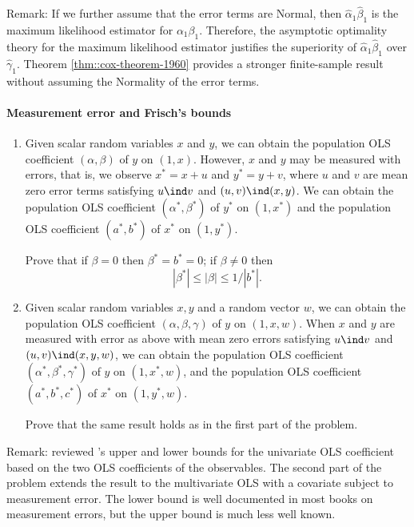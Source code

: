  

Remark: If we further assume that the error terms are Normal, then $\hat\alpha_1 \hat\beta_1$ is the maximum likelihood estimator for $\alpha_1 \beta_1$. Therefore, the asymptotic optimality theory for the maximum likelihood estimator justifies the superiority of $\hat\alpha_1 \hat\beta_1$ over $\hat\gamma_1$. Theorem \ref{thm::cox-theorem-1960} provides a stronger finite-sample result without assuming the Normality of the error terms. 



\paragraph{Measurement error and Frisch's bounds}\label{hw11::measurement-error}



\begin{enumerate}
\item
Given scalar random variables $x$ and $y$, we can obtain the population OLS coefficient $(\alpha, \beta)$ of $y$ on $(1,x)$. However, $x$ and $y$ may be measured with errors, that is, we observe $x^* = x + u$ and $y^* = y + v$, where $u$ and $v$ are mean zero error terms satisfying $u\ind v$  and $(u ,v )\ind (x,y)$. We can obtain the population OLS coefficient $(\alpha^*, \beta^*)$ of $y^*$ on $(1,x^*)$ and the population OLS coefficient $(a^*, b^*)$ of $x^*$ on $(1,y^*)$. 

 Prove that if $\beta = 0$ then $ \beta^*  =b^* = 0 $; if $\beta \neq  0$ then
$$ 
| \beta^* | \leq |\beta | \leq 
1 / |  b^* |   .
$$





\item
Given scalar random variables $x, y$ and a random vector $w$, we can obtain the population OLS coefficient $(\alpha, \beta, \gamma)$ of $y$ on $(1,x,w)$. When $x$ and $y$ are measured with error as above with mean zero errors satisfying $u\ind v$ and  $(u ,v )\ind (x,y,w)$, we can obtain the population OLS coefficient $(\alpha^*, \beta^*, \gamma^*)$ of $y$ on $(1,x^*,w)$, and the population OLS coefficient $(a^*, b^*, c^*)$ of $x^*$ on $(1,y^*,w)$.

Prove that the same result holds as in the first part of the problem. 
\end{enumerate}




Remark: \citet{tamer2010partial} reviewed \citet{frisch1934statistical}'s upper and lower bounds for the univariate OLS coefficient based on the two OLS coefficients of the observables. The second part of the problem extends the result to the multivariate OLS with a covariate subject to measurement error. The lower bound is well documented in most books on measurement errors, but the upper bound is much less well known. 





